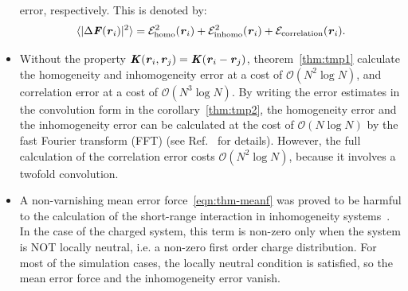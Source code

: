 \documentclass[aps,pre,preprint]{revtex4}
\renewcommand{\v}[1]{\textbf{\textit{#1}}}
\begin{document}
\begin{itemize}
  error, respectively.
  This is denoted by:
  \begin{align}\label{eqn:error-split}
    \langle\vert\Delta\v F(\v r_i)\vert^2\rangle
    =
    \mathcal E^2_{\textrm{homo}}(\v r_i) +
    \mathcal E^2_{\textrm{inhomo}}(\v r_i) +
    \mathcal E_{\textrm{correlation}}(\v r_i).
  \end{align}
\item
  Without the property $\v K(\v r_i,\v r_j) = \v K(\v r_i - \v r_j)$,
  theorem~\ref{thm:tmp1} calculate the homogeneity and inhomogeneity
  error at a cost of $\mathcal O(N^2\log N)$, and correlation error
  at a cost of $\mathcal O(N^3\log N)$.
  By writing the error estimates in the convolution form in
  the corollary~\ref{thm:tmp2},
  the homogeneity error and the inhomogeneity
  error can be calculated at the cost of $\mathcal O(N\log N)$ by the
  fast Fourier transform (FFT) (see Ref.~\cite{wang2012} for details).
  However, the full calculation of the correlation error costs $\mathcal
  O(N^2\log N)$, because it involves a twofold convolution.
\item A non-varnishing mean error force~\eqref{eqn:thm-meanf} was proved
  to be
  harmful to the calculation of the short-range interaction
  in inhomogeneity systems~\cite{wang2012}.
  In the case of the charged system, this
  term is non-zero only when the system is NOT locally neutral,
  i.e. a non-zero first order charge distribution. For
  most of the simulation cases, the locally neutral condition is
  satisfied, so the mean error force and the inhomogeneity error
  vanish.
\end{itemize}
\end{document}
